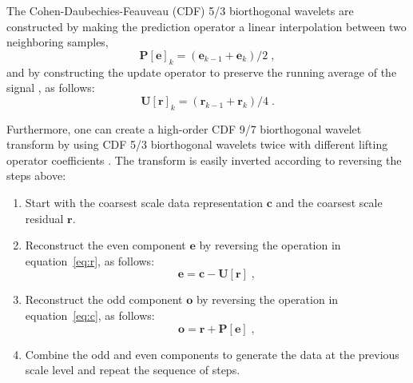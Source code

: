 The Cohen-Daubechies-Feauveau (CDF) 5/3 biorthogonal wavelets
\cite[]{Cohen92} are constructed by making the prediction operator a
linear interpolation between two neighboring samples,
\begin{equation}
  \label{eq:p}
  \mathbf{P[e]}_k = \left(\mathbf{e}_{k-1} + \mathbf{e}_{k}\right)/2\;,
\end{equation}
and by constructing the update operator to preserve the running
average of the signal \cite[]{athome}, as follows:
\begin{equation}
  \label{eq:u}
  \mathbf{U[r]}_k = \left(\mathbf{r}_{k-1} + \mathbf{r}_{k}\right)/4\;.
\end{equation}

Furthermore, one can create a high-order CDF 9/7 biorthogonal wavelet
transform by using CDF 5/3 biorthogonal wavelets twice with different
lifting operator coefficients \cite[]{Lian01}. The transform is
easily inverted according to reversing the steps above:       
\begin{enumerate}
\item Start with the coarsest scale data representation $\mathbf{c}$
      and the coarsest scale residual $\mathbf{r}$.
\item Reconstruct the even component $\mathbf{e}$ by reversing the 
      operation in equation~\ref{eq:r}, as follows:
\begin{equation}
    \label{eq:e}
    \mathbf{e} = \mathbf{c} - \mathbf{U[r]}\;,
  \end{equation}
\item Reconstruct the odd component 
  $\mathbf{o}$ by reversing the operation in equation~\ref{eq:c}, as follows:
  \begin{equation}
    \label{eq:o}
    \mathbf{o} = \mathbf{r}  + \mathbf{P[e]}\;,
  \end{equation} 
\item Combine the odd and even components to generate the data at 
      the previous scale level and repeat the sequence of steps.
\end{enumerate}






